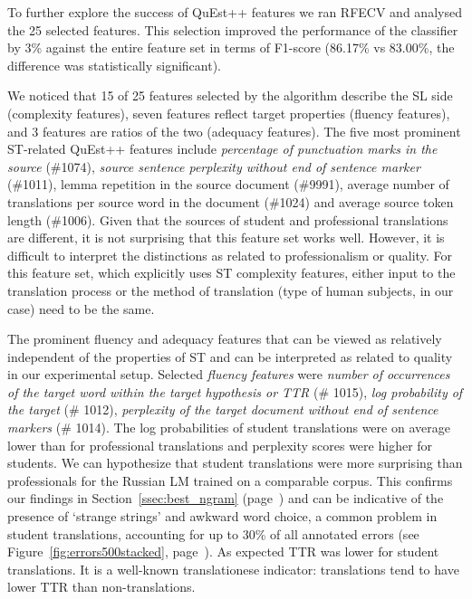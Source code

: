 To further explore the success of QuEst++ features we ran RFECV and analysed the 25 selected features. This selection improved the performance of the classifier by 3\% against the entire feature set in terms of F1-score (86.17\% vs 83.00\%, the difference was statistically significant). 

We noticed that 15 of 25 features selected by the algorithm describe the SL side (complexity features), seven features reflect target properties (fluency features), and 3 features are ratios of the two (adequacy features). 
The five most prominent ST-related QuEst++ features include \textit{percentage of punctuation marks in the source} (\#1074), \textit{source sentence perplexity without end of sentence marker} (\#1011), lemma repetition in the source document (\#9991), average number of translations per source word in the document (\#1024) and average source token length (\#1006).
Given that the sources of student and professional translations are different, it is not surprising that this feature set works well. However, it is difficult to interpret the distinctions as related to professionalism or quality. For this feature set, which explicitly uses ST complexity features, either input to the translation process or the method of translation (type of human subjects, in our case) need to be the same.

The prominent fluency and adequacy features that can be viewed as relatively independent of the properties of ST and can be interpreted as related to quality in our experimental setup. Selected \textit{fluency features} were \textit{number of occurrences of the target word within the target hypothesis or TTR} (\# 1015), \textit{log probability of the target} (\# 1012), \textit{perplexity of the target document without end of sentence markers} (\# 1014). 
The log probabilities of student translations were on average lower than for professional translations and perplexity scores were higher for students. We can hypothesize that student translations were more surprising than professionals for the Russian LM trained on a comparable corpus. This confirms our findings in Section~\ref{ssec:best_ngram} (page~\pageref{pg:stu_more_surprising_than_pro}) and can be indicative of the presence of `strange strings' and awkward word choice, a common problem in student translations, accounting for up to 30\% of all annotated errors (see Figure~\ref{fig:errors500stacked}, page~\pageref{fig:errors500stacked}).
As expected TTR was lower for student translations. It is a well-known translationese indicator: translations tend to have lower TTR than non-translations. %

